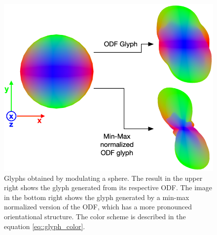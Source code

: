 \documentclass[twoside,twocolumn,10pt]{article}
\begin{document}
\begin{figure}[htb]
    \centering
    \includegraphics[width=1.00\linewidth, angle=0]{figs/SphericalMeshModulation.png}
    \caption{Glyphs obtained by modulating a sphere. The result in the upper right shows the glyph generated from its respective ODF. The image in the bottom right shows the glyph generated by a min-max normalized version of the ODF, which has a more pronounced orientational structure. The color scheme is described in the equation \ref{eq::glyph_color}.}
    \label{fig::intro_glyph}
\end{figure}

\end{document}
